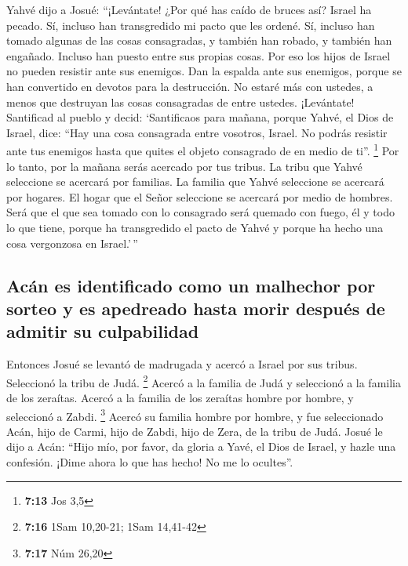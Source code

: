  Yahvé dijo a Josué: ``¡Levántate! ¿Por qué has caído de
bruces así?  Israel ha pecado. Sí, incluso han
transgredido mi pacto que les ordené. Sí, incluso han tomado algunas de
las cosas consagradas, y también han robado, y también han engañado.
Incluso han puesto entre sus propias cosas.  Por eso los
hijos de Israel no pueden resistir ante sus enemigos. Dan la espalda
ante sus enemigos, porque se han convertido en devotos para la
destrucción. No estaré más con ustedes, a menos que destruyan las cosas
consagradas de entre ustedes.  ¡Levántate! Santificad al
pueblo y decid: `Santificaos para mañana, porque Yahvé, el Dios de
Israel, dice: ``Hay una cosa consagrada entre vosotros, Israel. No
podrás resistir ante tus enemigos hasta que quites el objeto consagrado
de en medio de ti''. \footnote{\textbf{7:13} Jos 3,5} 
Por lo tanto, por la mañana serás acercado por tus tribus. La tribu que
Yahvé seleccione se acercará por familias. La familia que Yahvé
seleccione se acercará por hogares. El hogar que el Señor seleccione se
acercará por medio de hombres.  Será que el que sea
tomado con lo consagrado será quemado con fuego, él y todo lo que tiene,
porque ha transgredido el pacto de Yahvé y porque ha hecho una cosa
vergonzosa en Israel.'\,''

\hypertarget{acuxe1n-es-identificado-como-un-malhechor-por-sorteo-y-es-apedreado-hasta-morir-despuuxe9s-de-admitir-su-culpabilidad}{%
\subsection{Acán es identificado como un malhechor por sorteo y es
apedreado hasta morir después de admitir su
culpabilidad}\label{acuxe1n-es-identificado-como-un-malhechor-por-sorteo-y-es-apedreado-hasta-morir-despuuxe9s-de-admitir-su-culpabilidad}}

 Entonces Josué se levantó de madrugada y acercó a Israel
por sus tribus. Seleccionó la tribu de Judá. \footnote{\textbf{7:16}
  1Sam 10,20-21; 1Sam 14,41-42}  Acercó a la familia de
Judá y seleccionó a la familia de los zeraítas. Acercó a la familia de
los zeraítas hombre por hombre, y seleccionó a Zabdi. \footnote{\textbf{7:17}
  Núm 26,20}  Acercó su familia hombre por hombre, y fue
seleccionado Acán, hijo de Carmi, hijo de Zabdi, hijo de Zera, de la
tribu de Judá.  Josué le dijo a Acán: ``Hijo mío, por
favor, da gloria a Yavé, el Dios de Israel, y hazle una confesión. ¡Dime
ahora lo que has hecho! No me lo ocultes''.

